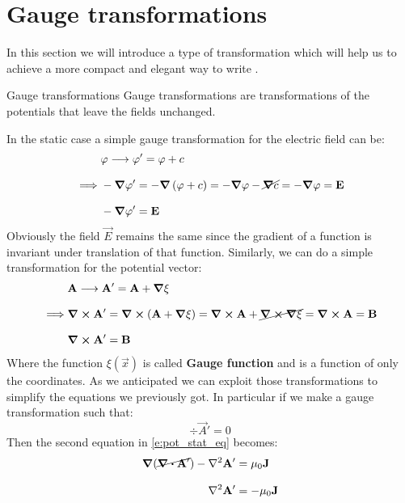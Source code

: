 \section{Gauge transformations}
In this section we will introduce a type of transformation which will help us to achieve a more compact and elegant way to write \maxwellref.
\begin{definition}{Gauge transformations}
  Gauge transformations are transformations of the potentials that leave the fields unchanged.
\end{definition}
\noindent In the static case a simple gauge transformation for the electric field can be:
\begin{equation}
  \begin{split}
    &\varphi \longrightarrow \varphi' = \varphi + c\\[8pt]
    \implies &-\grad{\varphi'} = -\grad{\left(\varphi+ c\right)} = -\grad{\varphi} - \cancel{\grad{c}} = -\grad{\varphi} = \vb{E}\\[8pt]
    &-\grad{\varphi'} = \vb{E}
  \end{split}
\end{equation}
Obviously the field $\vec{E}$ remains the same since the gradient of a function is invariant under translation of that function. Similarly, we can do a simple transformation for the potential vector:
\begin{equation}
  \begin{split}
    &\vb{A} \longrightarrow \vb{A}' = \vb{A} + \grad{\xi}\\[8pt]
    \implies &\curl{\vb{A}'} = \curl{\left(\vb{A} + \grad{\xi}\right)} = \curl{\vb{A}} + \cancel{\curl{\grad{\xi}}} = \curl{\vb{A}} = \vb{B}\\[8pt]
    &\curl{\vb{A}'} = \vb{B}
  \end{split}
\end{equation}
Where the function $\xi (\vec{x})$ is called \textbf{Gauge function} and is a function of only the coordinates. As we anticipated we can exploit those transformations to simplify the equations we previously got. In particular if we make a gauge transformation such that:
\begin{equation}
  \div{\vec{A}'} = 0
\end{equation}
Then the second equation in \eqref{e:pot_stat_eq} becomes:
\begin{equation}
  \begin{split}
    \grad{(\cancel{\div{\vec{A}'}})} - \lap{\vec{A}'} &= \muz \vec{J}\\[8pt]
    \lap{\vec{A}'} &= -\muz \vec{J}
  \end{split}
\end{equation}
